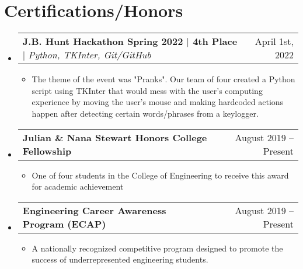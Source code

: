 \documentclass[letterpaper,11pt]{article}
\makeatletter
\newcommand{\resumeItem}[1]{
  \item\small{
    {#1 \vspace{-2pt}}
  }
}
\newcommand{\resumeProjectHeading}[2]{
    \item
    \begin{tabular*}{0.97\textwidth}{l@{\extracolsep{\fill}}r}
      \small#1 & #2 \\
    \end{tabular*}\vspace{-7pt}
}
\newcommand{\resumeItemListStart}{\begin{itemize}}
\newcommand{\resumeItemListEnd}{\end{itemize}\vspace{-5pt}}
\makeatother
\begin{document}
%




\section{Certifications/Honors}
\begin{itemize}[leftmargin=0.15in, label={}]
  \small
    \resumeProjectHeading
      {\textbf{J.B. Hunt Hackathon Spring 2022 $\mid$ 4th Place} $\mid$ \emph{Python, TKInter, Git/GitHub}}{April 1st, 2022}
        \resumeItemListStart
            \resumeItem{The theme of the event was "Pranks". Our team of four created a Python script using TKInter that would mess with the user's computing experience by moving the user's mouse and making hardcoded actions happen after detecting certain words/phrases from a keylogger.}
        \resumeItemListEnd
    \resumeProjectHeading
      {\textbf{Julian \& Nana Stewart Honors College Fellowship}}{August 2019 -- Present}
        \resumeItemListStart
            \resumeItem{One of four students in the College of Engineering to receive this award for academic achievement}
        \resumeItemListEnd
    \resumeProjectHeading
      {\textbf{Engineering Career Awareness Program (ECAP)}}{August 2019 -- Present}
        \resumeItemListStart
            \resumeItem{A nationally recognized competitive program designed to promote the success of underrepresented engineering students.}
        \resumeItemListEnd
\end{itemize}
\end{document}
